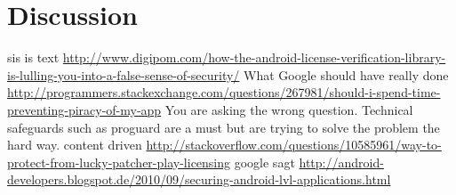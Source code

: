 \section{Discussion}\label{section:discussion}
sis is text
\url{http://www.digipom.com/how-the-android-license-verification-library-is-lulling-you-into-a-false-sense-of-security/} What Google should have really done
\newline
\url{http://programmers.stackexchange.com/questions/267981/should-i-spend-time-preventing-piracy-of-my-app} You are asking the wrong question. Technical safeguards such as proguard are a must but are trying to solve the problem the hard way.\newline
content driven \url{http://stackoverflow.com/questions/10585961/way-to-protect-from-lucky-patcher-play-licensing}\newline
google sagt \url{http://android-developers.blogspot.de/2010/09/securing-android-lvl-applications.html}\newline
